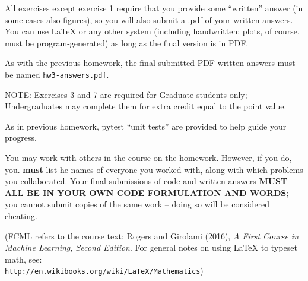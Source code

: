 \documentclass[10pt]{article}
\newcommand{\latex}{\LaTeX\xspace}
\begin{document}
All exercises except exercise 1 require that you provide some ``written'' answer (in some cases also figures), so you will also submit a .pdf of your written answers.  You can use \latex or any other system (including handwritten; plots, of course, must be program-generated) as long as the final version is in PDF. 

As with the previous homework, the final submitted PDF written answers must be named {\tt hw3-answers.pdf}.

NOTE: Exercises 3 and 7 are required for Graduate students only; Undergraduates may complete them for extra credit equal to the point value.

As in previous homework, pytest ``unit tests'' are provided to help guide your progress.

You may work with others in the course on the homework. However, if you do, you. {\bf must} list he names of everyone you worked with, along with which problems you collaborated. Your final submissions of code and written answers {\bf MUST ALL BE IN YOUR OWN CODE FORMULATION AND WORDS}; you cannot submit copies of the same work -- doing so will be considered cheating.

(FCML refers to the course text: Rogers and Girolami (2016), {\em A First Course in Machine Learning, Second Edition}.  For general notes on using \latex to typeset math, see:\\ {\tt http://en.wikibooks.org/wiki/LaTeX/Mathematics})
\vspace{.5cm}

\end{document}
